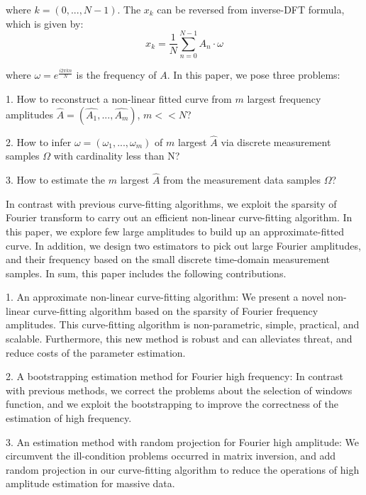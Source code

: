 \documentclass{sig-alternate}
\begin{document}
where $k = (0, ..., N-1)$. The $x_k$ can be reversed from inverse-DFT formula, which is given by:
\begin{displaymath}
x_k = \frac{1}{N}\sum_{n=0}^{N-1} A_n \cdot \omega
\end{displaymath}

where $\omega=e^{\frac{i2\pi kn}{N}}$ is the frequency of $A$. In this paper, we pose three problems:

1. How to reconstruct a non-linear fitted curve from $m$ largest frequency amplitudes $\hat{A} = (\hat{A_1}, ..., \hat{A_m})$, $m << N$? 

2. How to infer $\omega = (\omega_1, ..., \omega_m)$ of $m$ largest $\hat{A}$ via discrete measurement samples $\Omega$ with cardinality less than N?
 
3. How to estimate the $m$ largest $\hat{A}$ from the measurement data samples $\Omega$?       

In contrast with previous curve-fitting algorithms, we exploit the sparsity of Fourier transform to carry out an efficient non-linear curve-fitting algorithm. In this paper, we explore few large amplitudes to build up an approximate-fitted curve. In addition, we design two estimators to pick out large Fourier amplitudes, and their frequency based on the small discrete time-domain measurement samples. In sum, this paper includes the following contributions. 

1. An approximate non-linear curve-fitting algorithm: We present a novel non-linear curve-fitting algorithm based on the sparsity of Fourier frequency amplitudes. This curve-fitting algorithm is non-parametric, simple, practical, and scalable. Furthermore, this new method is robust and can alleviates threat, and reduce costs of the parameter estimation.    
  
2. A bootstrapping estimation method for Fourier high frequency: In contrast with previous methods\cite{Piotr:2014, Hassanieh:20121, Hassanieh:2012}, we correct the problems about the selection of windows function, and we exploit the bootstrapping to improve the correctness of the estimation of high frequency.

3. An estimation method with random projection for Fourier high amplitude: We circumvent the ill-condition problems occurred in matrix inversion, and add random projection in our curve-fitting algorithm to reduce the operations of high amplitude estimation for massive data. 
 
\end{document}
